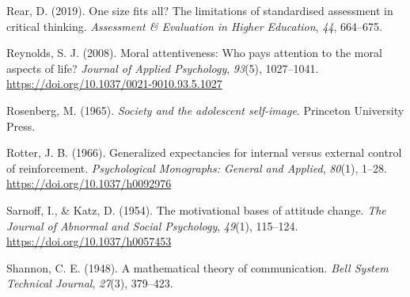 \documentclass[
  12pt,
  a4paper,
  twoside]{article}
\newlength{\cslhangindent}
\newlength{\cslentryspacingunit} %
\newenvironment{CSLReferences}[2] %
 {%
  \setlength{\parindent}{0pt}
  \ifodd #1
  \let\oldpar\par
  \def\par{\hangindent=\cslhangindent\oldpar}
  \fi
  \setlength{\parskip}{#2\cslentryspacingunit}
 }%
 {}
\begin{document}
\begin{CSLReferences}{1}{0}
\leavevmode{}%
Rear, D. (2019). One size fits all? The limitations of standardised assessment in critical thinking. \emph{Assessment \& Evaluation in Higher Education}, \emph{44}, 664--675.

\leavevmode{}%
Reynolds, S. J. (2008). Moral attentiveness: Who pays attention to the moral aspects of life? \emph{Journal of Applied Psychology}, \emph{93}(5), 1027--1041. \url{https://doi.org/10.1037/0021-9010.93.5.1027}

\leavevmode{}%
Rosenberg, M. (1965). \emph{Society and the adolescent self-image}. Princeton University Press.

\leavevmode{}%
Rotter, J. B. (1966). Generalized expectancies for internal versus external control of reinforcement. \emph{Psychological Monographs: General and Applied}, \emph{80}(1), 1--28. \url{https://doi.org/10.1037/h0092976}

\leavevmode{}%
Sarnoff, I., \& Katz, D. (1954). The motivational bases of attitude change. \emph{The Journal of Abnormal and Social Psychology}, \emph{49}(1), 115--124. \url{https://doi.org/10.1037/h0057453}

\leavevmode{}%
Shannon, C. E. (1948). A mathematical theory of communication. \emph{Bell System Technical Journal}, \emph{27}(3), 379--423.

\end{CSLReferences}
\end{document}
